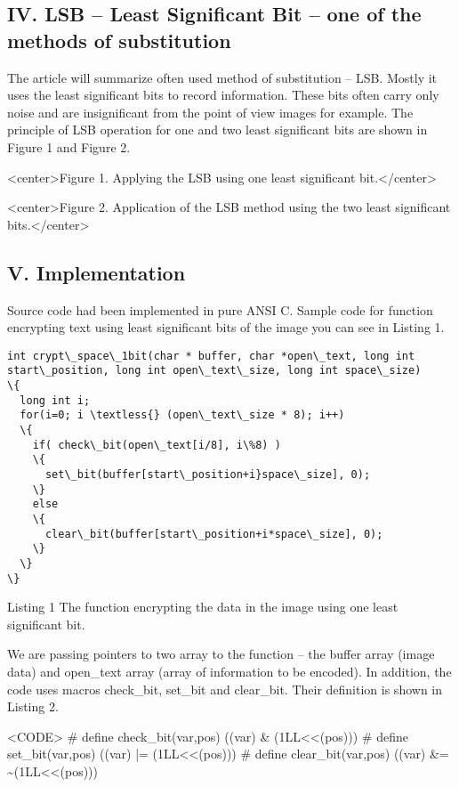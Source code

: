 \documentclass[10pt, a5paper]{article}
\begin{document}
\subsection*{IV. LSB -- Least Significant Bit -- one of the methods of substitution}

The article will summarize often used method of substitution -- LSB. Mostly it uses the least significant bits to record information. These bits often carry only noise and are insignificant from the point of view images for example. The principle of LSB operation for one and two least significant bits are shown in Figure 1 and Figure 2.


<center>Figure 1. Applying the LSB using one least significant bit.</center>


<center>Figure 2. Application of the LSB method using the two least significant bits.</center>

\subsection*{V. Implementation}

Source code had been implemented in pure ANSI C. Sample code for function encrypting text using least significant bits of the image you can see in Listing 1.

\begin{verbatim}
int crypt\_space\_1bit(char * buffer, char *open\_text, long int start\_position, long int open\_text\_size, long int space\_size)
\{
  long int i;
  for(i=0; i \textless{} (open\_text\_size * 8); i++)
  \{
    if( check\_bit(open\_text[i/8], i\%8) )
    \{
      set\_bit(buffer[start\_position+i}space\_size], 0);
    \}
    else
    \{
      clear\_bit(buffer[start\_position+i*space\_size], 0);
    \}
  \}
\}
\end{verbatim}

Listing 1 The function encrypting the data in the image using one least significant bit.

We are passing pointers to two array to the function -- the buffer array (image data) and open\_text array (array of information to be encoded). In addition, the code uses macros check\_bit, set\_bit and clear\_bit. Their definition is shown in Listing 2.

<CODE>
\# define check\_bit(var,pos) ((var) \& (1LL\textless{}\textless{}(pos)))
\# define set\_bit(var,pos) ((var) |= (1LL\textless{}\textless{}(pos)))
\# define clear\_bit(var,pos) ((var) \&= \~{}(1LL\textless{}\textless{}(pos)))
\end{document}
